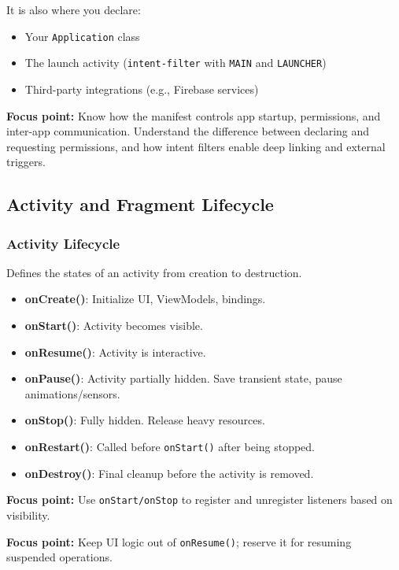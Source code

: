 \documentclass[a4paper,12pt]{article}
\begin{document}
It is also where you declare:
\begin{itemize}
  \item Your \texttt{Application} class
  \item The launch activity (\texttt{intent-filter} with \texttt{MAIN} and \texttt{LAUNCHER})
  \item Third-party integrations (e.g., Firebase services)
\end{itemize}

\textbf{Focus point:} Know how the manifest controls app startup, permissions, and inter-app communication. Understand the difference between declaring and requesting permissions, and how intent filters enable deep linking and external triggers.

\subsection{Activity and Fragment Lifecycle}

\subsubsection{Activity Lifecycle}

Defines the states of an activity from creation to destruction.

\begin{itemize}
  \item \textbf{onCreate()}: Initialize UI, ViewModels, bindings.
  \item \textbf{onStart()}: Activity becomes visible.
  \item \textbf{onResume()}: Activity is interactive.
  \item \textbf{onPause()}: Activity partially hidden. Save transient state, pause animations/sensors.
  \item \textbf{onStop()}: Fully hidden. Release heavy resources.
  \item \textbf{onRestart()}: Called before \texttt{onStart()} after being stopped.
  \item \textbf{onDestroy()}: Final cleanup before the activity is removed.
\end{itemize}

\textbf{Focus point:} Use \texttt{onStart/onStop} to register and unregister listeners based on visibility.

\textbf{Focus point:} Keep UI logic out of \texttt{onResume()}; reserve it for resuming suspended operations.
\end{document}
